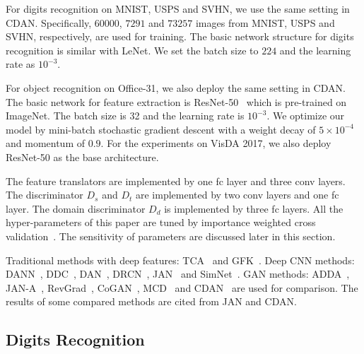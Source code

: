 \documentclass[sigconf]{acmart}
\begin{document}
For digits recognition on MNIST, USPS and SVHN, we use the same setting in CDAN. Specifically, $60000$, $7291$ and $73257$ images from MNIST, USPS and SVHN, respectively, are used for training. The basic network structure for digits recognition is similar with LeNet. We set the batch size to $224$ and the learning rate as $10^{-3}$.

For object recognition on Office-31, we also deploy the same setting in CDAN. The basic network for feature extraction is ResNet-50~\cite{he2016deep} which is pre-trained on ImageNet. The batch size is 32 and the learning rate is $10^{-3}$. We optimize our model by mini-batch stochastic gradient descent with a weight decay of $5\times10^{-4}$ and momentum of $0.9$. For the experiments on VisDA 2017, we also deploy ResNet-50 as the base architecture.

The feature translators are implemented by one fc layer and three conv layers. The discriminator $D_s$ and $D_t$ are implemented by two conv layers and one fc layer. The domain discriminator $D_d$ is implemented by three fc layers. All the hyper-parameters of this paper are tuned by importance weighted cross validation~\cite{sugiyama2007covariate}. The sensitivity of parameters are discussed later in this section. 

Traditional methods with deep features: TCA~\cite{pan2011domain} and GFK~\cite{gong2012geodesic}. Deep CNN methods: DANN~\cite{ganin2014unsupervised}, DDC~\cite{tzeng2014deep}, DAN~\cite{long2015learning}, DRCN~\cite{ghifary2016deep}, JAN~\cite{long2017deep} and SimNet~\cite{pinheiro2018unsupervised}. GAN methods: ADDA~\cite{tzeng2017adversarial}, JAN-A~\cite{long2017deep}, RevGrad~\cite{ganin2016domain}, CoGAN~\cite{liu2016coupled}, MCD~\cite{saito2018maximum} and CDAN~\cite{long2018conditional} are used for comparison. The results of some compared methods are cited from JAN and CDAN.



\subsection{Digits Recognition}
\end{document}
